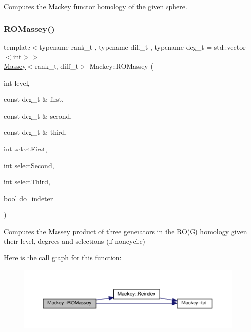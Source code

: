Computes the \hyperlink{namespaceMackey}{Mackey} functor homology of the given sphere. 

\mbox{\label{namespaceMackey_a9fcefe47f5a8a416b173517377a61bd0}} 
\subsubsection{\texorpdfstring{R\+O\+Massey()}{ROMassey()}\hspace{0.1cm}{\footnotesize\ttfamily [1/2]}}
{\footnotesize\ttfamily template$<$typename rank\+\_\+t , typename diff\+\_\+t , typename deg\+\_\+t  = std\+::vector$<$int$>$$>$ \\
\hyperlink{classMackey_1_1Massey}{Massey}$<$rank\+\_\+t, diff\+\_\+t$>$ Mackey\+::\+R\+O\+Massey (\begin{DoxyParamCaption}\item[{int}]{level,  }\item[{const deg\+\_\+t \&}]{first,  }\item[{const deg\+\_\+t \&}]{second,  }\item[{const deg\+\_\+t \&}]{third,  }\item[{int}]{select\+First,  }\item[{int}]{select\+Second,  }\item[{int}]{select\+Third,  }\item[{bool}]{do\+\_\+indeter }\end{DoxyParamCaption})}



Computes the \hyperlink{classMackey_1_1Massey}{Massey} product of three generators in the R\+O(\+G) homology given their level, degrees and selections (if noncyclic) 

Here is the call graph for this function\+:\nopagebreak
\begin{figure}[H]
\begin{center}
\leavevmode
\includegraphics[width=350pt]{namespaceMackey_a9fcefe47f5a8a416b173517377a61bd0_cgraph}
\end{center}
\end{figure}
\mbox{\label{namespaceMackey_afa8c8ea3bfdd5edbda71827e0b796fb1}} 
